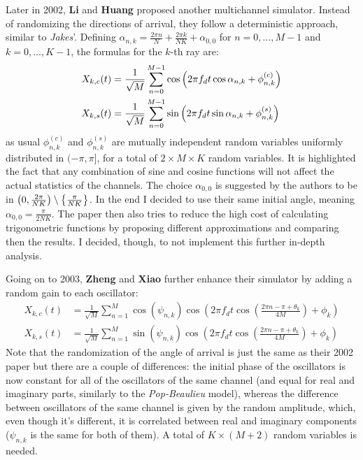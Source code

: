 Later in 2002, \textbf{Li} and \textbf{Huang} \cite{C1} proposed another multichannel simulator. Instead of randomizing the directions of arrival, they follow a deterministic approach, similar to \textit{Jakes}'. Defining $\alpha_{n,k} = \frac{2\pi n}{N} + \frac{2 \pi k}{NK} + \alpha_{0,0}$ for $n = 0,...,M-1$ and $k=0,...,K-1$, the formulas for the $k$-th ray are:%
%
\begin{subequations}
\begin{align}
X_{k,c}(t) &= \frac{1}{\sqrt{M}} \sum_{n=0}^{M-1} \cos \qty( 2\pi f_d t \cos \alpha_{n,k} + \phi_{n,k}^{(c)} )\\
X_{k,s}(t) &= \frac{1}{\sqrt{M}} \sum_{n=0}^{M-1} \sin \qty( 2\pi f_d t \sin \alpha_{n,k} + \phi_{n,k}^{(s)} )
\end{align}
\end{subequations}%
%
as usual $\phi_{n,k}^{(c)}$ and $\phi_{n,k}^{(s)}$ are mutually independent random variables uniformly distributed in $(-\pi,\pi]$, for a total of $2\times M \times K$ random variables. It is highlighted the fact that any combination of sine and cosine functions will not affect the actual statistics of the channels. The choice $\alpha_{0,0}$ is suggested by the authors to be in $\qty(0,\frac{2\pi}{NK}) \setminus \qty{\frac{\pi}{NK}}$. In the end I decided to use their same initial angle, meaning $\alpha_{0,0} = \frac{\pi}{2NK}$. The paper then also tries to reduce the high cost of calculating trigonometric functions by proposing different approximations and comparing then the results. I decided, though, to not implement this further in-depth analysis.

Going on to 2003, \textbf{Zheng} and \textbf{Xiao} \cite{A2} further enhance their simulator by adding a random gain to each oscillator:%
%
\begin{subequations}
\begin{align}
X_{k,c}(t) &= \frac{1}{\sqrt{M}} \sum_{n=1}^{M} \cos(\psi_{n,k})\cos \left( 2\pi f_d t \cos \left( \frac{2\pi n - \pi + \theta_k}{4M}\right) + \phi_k \right)\\
X_{k,s}(t) &= \frac{1}{\sqrt{M}} \sum_{n=1}^{M} \sin(\psi_{n,k})\cos \left( 2\pi f_d t \cos \left( \frac{2\pi n - \pi + \theta_k}{4M}\right) + \phi_k \right)
\end{align}
\end{subequations}%
%
Note that the randomization of the angle of arrival is just the same as their 2002 paper but there are a couple of differences: the initial phase of the oscillators is now constant for all of the oscillators of the same channel (and equal for real and imaginary parts, similarly to the \textit{Pop-Beaulieu} model), whereas the difference between oscillators of the same channel is given by the random amplitude, which, even though it's different, it is correlated between real and imaginary components ($\psi_{n,k}$ is the same for both of them). A total of $K \times (M+2)$ random variables is needed.

